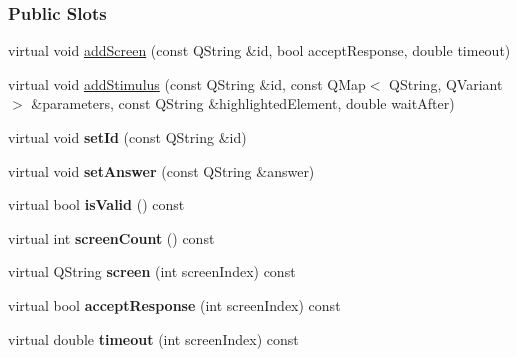 \subsubsection*{Public Slots}
\begin{DoxyCompactItemize}
\item
virtual void \hyperlink{classapex_1_1data_1_1_trial_a67a512581ed1cc6196615f1dded42f4c}{add\-Screen} (const Q\-String \&id, bool accept\-Response, double timeout)
\item
virtual void \hyperlink{classapex_1_1data_1_1_trial_ad3c38f5ebd9947680bcce7b40a6f8120}{add\-Stimulus} (const Q\-String \&id, const Q\-Map$<$ Q\-String, Q\-Variant $>$ \&parameters, const Q\-String \&highlighted\-Element, double wait\-After)
\item
\hypertarget{classapex_1_1data_1_1_trial_af7fdd956d0035beaf30bd135c1007822}{virtual void {\bfseries set\-Id} (const Q\-String \&id)}\label{classapex_1_1data_1_1_trial_af7fdd956d0035beaf30bd135c1007822}

\item
\hypertarget{classapex_1_1data_1_1_trial_af673c95982c97a8b50cc026eee5f5e09}{virtual void {\bfseries set\-Answer} (const Q\-String \&answer)}\label{classapex_1_1data_1_1_trial_af673c95982c97a8b50cc026eee5f5e09}

\item
\hypertarget{classapex_1_1data_1_1_trial_a5fbe3245b84c367ff162667f4f2b3567}{virtual bool {\bfseries is\-Valid} () const }\label{classapex_1_1data_1_1_trial_a5fbe3245b84c367ff162667f4f2b3567}

\item
\hypertarget{classapex_1_1data_1_1_trial_a6f44fdfde39d244b5c49ed0caebe8b0a}{virtual int {\bfseries screen\-Count} () const }\label{classapex_1_1data_1_1_trial_a6f44fdfde39d244b5c49ed0caebe8b0a}

\item
\hypertarget{classapex_1_1data_1_1_trial_af1b99e910c119dc83bddbb78ef2558e3}{virtual Q\-String {\bfseries screen} (int screen\-Index) const }\label{classapex_1_1data_1_1_trial_af1b99e910c119dc83bddbb78ef2558e3}

\item
\hypertarget{classapex_1_1data_1_1_trial_a87f814e5f4983950aae9235825ff5c56}{virtual bool {\bfseries accept\-Response} (int screen\-Index) const }\label{classapex_1_1data_1_1_trial_a87f814e5f4983950aae9235825ff5c56}

\item
\hypertarget{classapex_1_1data_1_1_trial_a91401ad7472496c5fab3dc0829791e9c}{virtual double {\bfseries timeout} (int screen\-Index) const }\label{classapex_1_1data_1_1_trial_a91401ad7472496c5fab3dc0829791e9c}


\end{DoxyCompactItemize}
